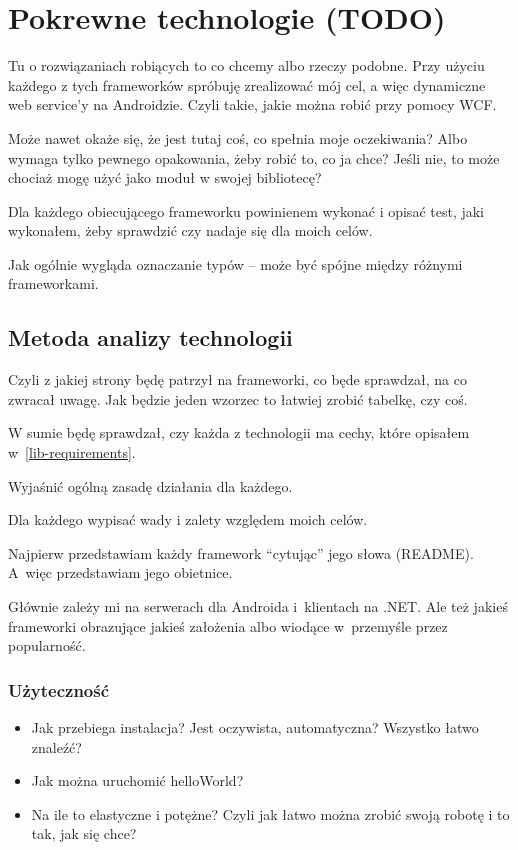 \chapter{Pokrewne technologie (TODO)}
Tu o rozwiązaniach robiących to co chcemy albo rzeczy podobne. Przy użyciu każdego z tych frameworków spróbuję zrealizować mój cel, a więc dynamiczne web service'y na Androidzie. Czyli takie, jakie można robić przy pomocy WCF.

Może nawet okaże się, że jest tutaj coś, co spełnia moje oczekiwania? Albo wymaga tylko pewnego opakowania, żeby robić to, co ja chce?
Jeśli nie, to może chociaż mogę użyć jako moduł w swojej bibliotecę?

Dla każdego obiecującego frameworku powinienem wykonać i opisać test, jaki wykonałem, żeby sprawdzić czy nadaje się dla moich celów.

Jak ogólnie wygląda oznaczanie typów -- może być spójne między różnymi frameworkami.

\section{Metoda analizy technologii}
Czyli z jakiej strony będę patrzył na frameworki, co będe sprawdzał, na co zwracał uwagę. Jak będzie jeden wzorzec to łatwiej zrobić tabelkę, czy coś.

W sumie będę sprawdzał, czy każda z technologii ma cechy, które opisałem w~\ref{lib-requirements}.

Wyjaśnić ogólną zasadę działania dla każdego.

Dla każdego wypisać wady i zalety względem moich celów.

Najpierw przedstawiam każdy framework ``cytując'' jego słowa (README). A~więc przedstawiam jego obietnice.

Głównie zależy mi na serwerach dla Androida i~klientach na .NET\@. Ale też jakieś frameworki obrazujące jakieś założenia albo wiodące w~przemyśle przez popularność.

\subsection{Użyteczność}
\begin{itemize}
	\item Jak przebiega instalacja? Jest oczywista, automatyczna? Wszystko łatwo znaleźć?
	\item Jak można uruchomić helloWorld?
	\item Na ile to elastyczne i potężne? Czyli jak łatwo można zrobić swoją robotę i to tak, jak się chce?
\end{itemize}

